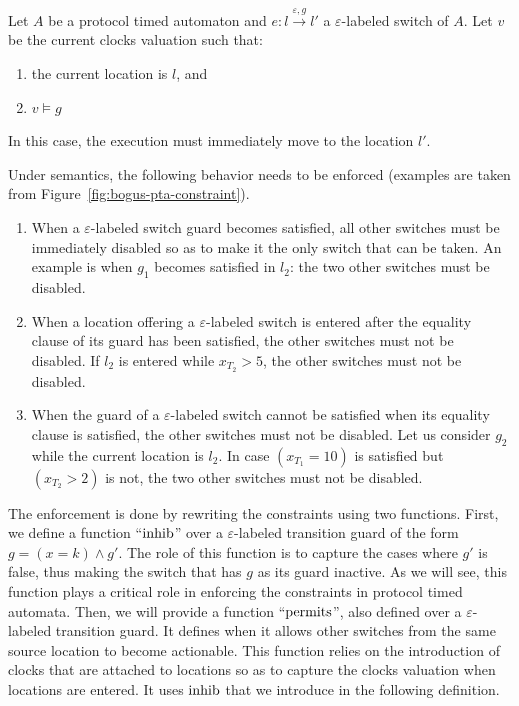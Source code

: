 \begin{definition}
Let $A$ be a protocol timed automaton and $e: l \xrightarrow{\varepsilon, g} l'$ a $\varepsilon$-labeled switch of $A$. Let $v$ be the current clocks valuation such that:
\begin{enumerate}
  
  \item the current location is $l$, and
  
  \item $v \models g$
  
\end{enumerate}
In this case, the execution must immediately move to the location $l'$.
\end{definition}

Under \MInvoke semantics, the following behavior needs to be enforced (examples are taken from Figure~\ref{fig:bogus-pta-constraint}).
\begin{enumerate}
  
  \item When a $\varepsilon$-labeled switch guard becomes satisfied, all other switches must be immediately disabled so as to make it the only switch that can be taken. An example is when $g_1$ becomes satisfied in $l_2$: the two other switches must be disabled.
  
  \item When a location offering a $\varepsilon$-labeled switch is entered after the equality clause of its guard has been satisfied, the other switches must not be disabled. If $l_2$ is entered while $x_{T_2} > 5$, the other switches must not be disabled.
  
  \item When the guard of a $\varepsilon$-labeled switch cannot be satisfied when its equality clause is satisfied, the other switches must not be disabled. Let us consider $g_2$ while the current location is $l_2$. In case $(x_{T_1} = 10)$ is satisfied but $(x_{T_2} > 2)$ is not, the two other switches must not be disabled.
  
\end{enumerate}

The enforcement is done by rewriting the constraints using two functions. First, we define a function ``$\operatorname{inhib}$'' over a $\varepsilon$-labeled transition guard of the form $g = (x = k) \wedge g'$. The role of this function is to capture the cases where $g'$ is false, thus making the switch that has $g$ as its guard inactive. As we will see, this function plays a critical role in enforcing the \MInvoke constraints in protocol timed automata. Then, we will provide a function ``$\operatorname{permits}$'', also defined over a $\varepsilon$-labeled transition guard. It defines when it allows other switches from the same source location to become actionable. This function relies on the introduction of clocks that are attached to locations so as to capture the clocks valuation when locations are entered. It uses $\operatorname{inhib}$ that we introduce in the following definition.

